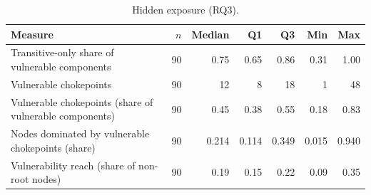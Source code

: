 \begin{table}[!htpb]
    \centering
    \small
    \caption{Hidden exposure (RQ3).}
    \label{tab:eval-rq3}
    \begin{tabular}{lrrrrrr}
        \toprule
        \textbf{Measure} & \(n\) & \textbf{Median} & \textbf{Q1} & \textbf{Q3} & \textbf{Min} & \textbf{Max} \\
        \midrule
        Transitive-only share of vulnerable components & 90 & 0.75 & 0.65 & 0.86 & 0.31 & 1.00 \\
        Vulnerable chokepoints & 90 & 12 & 8 & 18 & 1 & 48 \\
        Vulnerable chokepoints (share of vulnerable components) & 90 & 0.45 & 0.38 & 0.55 & 0.18 & 0.83 \\
        Nodes dominated by vulnerable chokepoints (share) & 90 & 0.214 & 0.114 & 0.349 & 0.015 & 0.940 \\
        Vulnerability reach (share of non-root nodes) & 90 & 0.19 & 0.15 & 0.22 & 0.09 & 0.35 \\
        \bottomrule
    \end{tabular}
\end{table}
